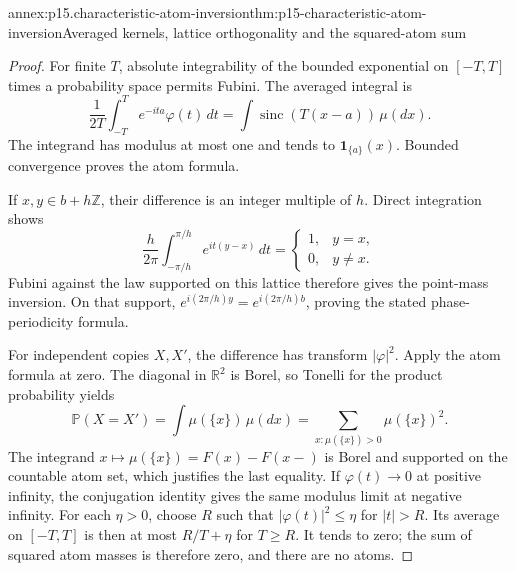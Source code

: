 \begin{annexitem}{annex:p15.characteristic-atom-inversion}{thm:p15-characteristic-atom-inversion}{Averaged kernels, lattice orthogonality and the squared-atom sum}
\begin{proof}
For finite \(T\), absolute integrability of the bounded
exponential on \([-T,T]\) times a probability space
permits Fubini. The averaged integral is
\[
 \frac1{2T}\int_{-T}^T e^{-ita}\varphi(t)\,dt
       =\int\operatorname{sinc}(T(x-a))\,\mu(dx).
\]
The integrand has modulus at most one and tends to
\(\mathbf1_{\{a\}}(x)\). Bounded convergence proves
the atom formula.

If \(x,y\in b+h\mathbb Z\), their difference is an
integer multiple of \(h\). Direct integration shows
\[
 \frac h{2\pi}\int_{-\pi/h}^{\pi/h}e^{it(y-x)}\,dt
 =\begin{cases}1,&y=x,\\0,&y\ne x.\end{cases}
\]
Fubini against the law supported on this lattice
therefore gives the point-mass inversion.
On that support,
\(e^{i(2\pi/h)y}=e^{i(2\pi/h)b}\), proving the
stated phase-periodicity formula.

For independent copies \(X,X'\), the difference has
transform \(|\varphi|^2\).
Apply the atom formula at zero.
The diagonal in \(\mathbb R^2\) is Borel, so Tonelli
for the product probability yields
\[
 \mathbb P(X=X')=\int\mu(\{x\})\,\mu(dx)
              =\sum_{x:\mu(\{x\})>0}\mu(\{x\})^2.
\]
The integrand \(x\mapsto\mu(\{x\})=F(x)-F(x-)\)
is Borel and supported on the countable atom set,
which justifies the last equality.
If \(\varphi(t)\to0\) at positive infinity, the
conjugation identity gives the same modulus limit
at negative infinity. For each \(\eta>0\), choose
\(R\) such that \(|\varphi(t)|^2\leq\eta\) for
\(|t|>R\). Its average on \([-T,T]\) is then at
most \(R/T+\eta\) for \(T\geq R\).
It tends to zero; the sum of squared atom masses
is therefore zero, and there are no atoms.
\end{proof}
\end{annexitem}

